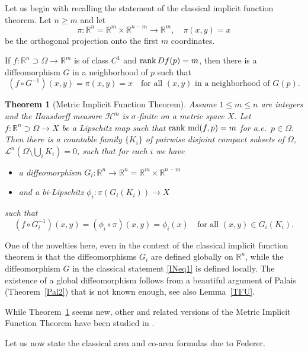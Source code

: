 \documentclass[12pt,leqno]{amsart}
\newtheorem{theorem}{Theorem}
\theoremstyle{definition}
\newcommand{\bbbr}{\mathbb R}
\def\H{{\mathcal H}}
\def\LL{{\mathcal L}}
\def\rank{{\rm rank\,}}
\def\md{\operatorname{md}}
\numberwithin{theorem}{section} \numberwithin{equation}{section}
\begin{document}
Let us begin with recalling the statement of the classical implicit function theorem. Let $n\geq m$ and let
$$
\pi:\bbbr^n=\bbbr^m\times\bbbr^{n-m}\to\bbbr^m,
\quad
\pi(x,y)=x
$$
be the orthogonal projection onto the first $m$ coordinates.

If $f:\bbbr^n\supset\Omega\to\bbbr^m$ is of class $C^1$ and $\rank Df(p)=m$, then there is a diffeomorphism $G$ in a neighborhood of $p$ such that
\begin{equation}
\label{INeq1}
(f\circ G^{-1})(x,y)=\pi(x,y)=x
\quad
\text{for all $(x,y)$ in a neighborhood of } G(p).
\end{equation}

\begin{theorem}[Metric Implicit Function Theorem]
\label{INT2}
Assume $1\leq m\leq n$ are integers and the Hausdorff measure $\H^m$ is $\sigma$-finite on a metric space $X$. Let $f\colon \bbbr^n\supset\Omega\to X$ be a Lipschitz map such that $\rank \md (f,p)=m$ for a.e.\ $p\in \Omega$.
Then there is a countable family $\{K_i\}$ of pairwise disjoint compact subsets of $\Omega$,  $\LL^n(\Omega\setminus \bigcup_i K_i)=0$, such that for each $i$ we have
\begin{itemize}
\item a diffeomorphism $G_i:\bbbr^n\to\bbbr^n=\bbbr^m\times\bbbr^{n-m}$
\item and a bi-Lipschitz $\phi_i:\pi(G_i(K_i))\to X$
\end{itemize}
such that
$$
(f\circ G_i^{-1})(x,y)=
(\phi_i\circ\pi)(x,y)=
\phi_i(x)
\quad
\text{for all }(x,y)\in G_i(K_i).
$$
\end{theorem}
One of the novelties here, even in the context of the classical implicit function theorem is that the diffeomorphisms $G_i$ are defined globally on $\bbbr^n$, while the diffeomorphism $G$ in the classical statement \eqref{INeq1} is defined locally. The existence of a global diffeomorphism follows from a beautiful argument of Palais (Theorem~\ref{Pal2}) that is not known enough, see also Lemma~\ref{TFU}.

While Theorem~\ref{INT2} seems new, other and related versions of the Metric Implicit Function Theorem have been studied in \cite{azzams,davids,HZ}.

Let us now state the classical area \cite{fed2} and co-area \cite{fed3} formulas due to Federer.
\end{document}
